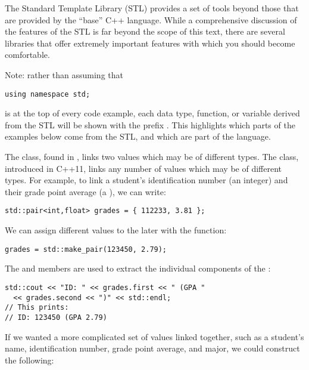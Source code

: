The Standard Template Library (STL) provides a set of tools beyond those that are provided by the ``base'' C++ language. 
While a comprehensive discussion of the features of the STL is far beyond the scope of this text, there are several libraries that offer extremely important features with which you should become comfortable. 

Note: rather than assuming that 

\begin{lstlisting}
using namespace std;
\end{lstlisting}

\noindent is at the top of every code example, each data type, function, or variable derived from the STL will be shown with the prefix . 
This highlights which parts of the examples below come from the STL, and which are part of the language.


The  class, found in , links two values which may be of different types. 
The  class, introduced in C++11, links any number of values which may be of different types. 
For example, to link a student's identification number (an integer) and their grade point average (a ), we can write:

\begin{lstlisting}
std::pair<int,float> grades = { 112233, 3.81 };
\end{lstlisting}

We can assign different values to the  later with the  function:

\begin{lstlisting}
grades = std::make_pair(123450, 2.79);
\end{lstlisting}

The  and  members are used to extract the individual components of the :

\begin{lstlisting}
std::cout << "ID: " << grades.first << " (GPA " 
  << grades.second << ")" << std::endl;
// This prints:
// ID: 123450 (GPA 2.79)
\end{lstlisting}

If we wanted a more complicated set of values linked together, such as a student's name, identification number, grade point average, and major, we could construct the following:

